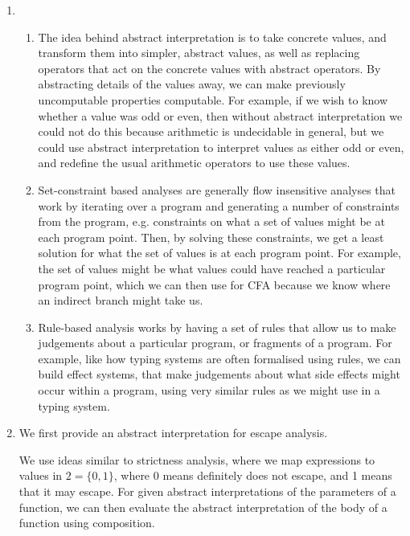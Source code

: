 


\begin{enumerate}[label=(\alph*)]
  \item

  \begin{enumerate}[label=(\roman*)]

    \item

      The idea behind abstract interpretation is to take concrete values, and transform them into simpler, abstract values, as well as replacing operators that act on the concrete values with abstract operators. By abstracting details of the values away, we can make previously uncomputable properties computable. For example, if we wish to know whether a value was odd or even, then without abstract interpretation we could not do this because arithmetic is undecidable in general, but we could use abstract interpretation to interpret values as either odd or even, and redefine the usual arithmetic operators to use these values.

    \item
      Set-constraint based analyses are generally flow insensitive analyses that work by iterating over a program and generating a number of constraints from the program, e.g. constraints on what a set of values might be at each program point. Then, by solving these constraints, we get a least solution for what the set of values is at each program point. For example, the set of values might be what values could have reached a particular program point, which we can then use for CFA because we know where an indirect branch might take us.

    \item
      Rule-based analysis works by having a set of rules that allow us to make judgements about a particular program, or fragments of a program. For example, like how typing systems are often formalised using rules, we can build effect systems, that make judgements about what side effects might occur within a program, using very similar rules as we might use in a typing system.
      
  \end{enumerate}

\item
  We first provide an abstract interpretation for escape analysis.

  We use ideas similar to strictness analysis, where we map expressions to values in $2 = \{0,1\}$, where 0 means definitely does not escape, and 1 means that it may escape. For given abstract interpretations of the parameters of a function, we can then evaluate the abstract interpretation of the body of a function using composition.


\end{enumerate}
